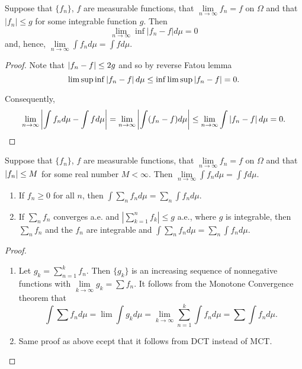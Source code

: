 \begin{theorem}
Suppose that $\{f_n\}$, $f$ are measurable functions, that $\lim\limits_{n\to\infty}f_n=f$ on $\Omega$ and that $\vert f_n\vert \leq g$ for some integrable function $g$. Then
\begin{equation*}
\lim\limits_{n\to\infty}\inf \vert f_n-f\vert d\mu=0
\end{equation*}
and, hence, $\lim\limits_{n\to\infty}\int f_nd\mu=\int fd\mu$.
\end{theorem}




\begin{proof}
Note that $\left\lvert f_n-f\right\rvert\leq 2g$ and so by reverse Fatou lemma
\begin{equation*}
\limsup \inf\left\lvert f_n-f\right\rvert d\mu \leq \inf \limsup\left\lvert f_n-f\right\rvert=0.
\end{equation*}

Consequently,
\begin{equation*}
\lim\limits_{n\to\infty}\left\lvert\int f_nd\mu - \int fd\mu \right\rvert=\lim_{n\to\infty}\left\lvert \int (f_n-f)d\mu \right\rvert \leq \lim\limits_{n\to\infty}\int \left\lvert f_n-f\right\rvert d\mu = 0.
\end{equation*}
\end{proof}




\begin{corollary}
Suppose that $\{f_n\}$, $f$ are measurable functions, that $\lim\limits_{n\to\infty}f_n=f$ on $\Omega$ and that $\left\lvert f_n\right\rvert\leq M$ for some real number $M<\infty$. Then $\lim\limits_{n\to\infty}\int f_nd\mu=\int fd\mu$.
\end{corollary}



\begin{theorem}
\begin{enumerate}
\item If $f_n\geq 0$ for all $n$, then $\int\sum_n f_n d\mu=\sum_n \int f_nd\mu$.
\item If $\sum_n f_n$ converges a.e. and $\left\lvert \sum_{k=1}^{n}f_k\right\rvert\leq g$ a.e., where $g$ is integrable, then $\sum_n f_n$ and the $f_n$ are integrable and $\int \sum_n f_n d\mu=\sum_n \int f_n d\mu$.
\end{enumerate}
\end{theorem}


\begin{proof}
\begin{enumerate}
\item Let $g_k=\sum_{n=1}^{k} f_n$. Then $\{g_k \}$ is an increasing sequence of nonnegative functions with $\lim\limits_{k\to\infty}g_k=\sum f_n$. It follows from the Monotone Convergence theorem that
\begin{equation*}
\int\sum f_nd\mu =\lim\int g_k d\mu = \lim\limits_{k\to\infty}\sum_{n=1}^{k}\int f_n d\mu=\sum \int f_n d\mu.
\end{equation*}

\item Same proof as above ecept that it follows from DCT instead of MCT.
\end{enumerate}
\end{proof}
